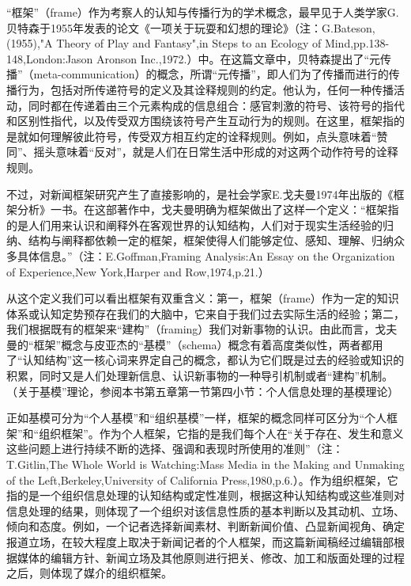 \documentclass[UTF8,12pt]{ctexart}
\numberwithin{equation}{section} %
\numberwithin{figure}{section}
\numberwithin{table}{section}
\begin{document}
	“框架”（frame）作为考察人的认知与传播行为的学术概念，最早见于人类学家G.贝特森于1955年发表的论文《一项关于玩耍和幻想的理论》（注：G.Bateson,(1955),"A Theory of Play and Fantasy",in Steps to an Ecology of Mind,pp.138-148,London:Jason Aronson Inc.,1972.）中。在这篇文章中，贝特森提出了“元传播”（meta-communication）的概念，所谓“元传播”，即人们为了传播而进行的传播行为，包括对所传递符号的定义及其诠释规则的约定。他认为，任何一种传播活动，同时都在传递着由三个元素构成的信息组合：感官刺激的符号、该符号的指代和区别性指代，以及传受双方围绕该符号产生互动行为的规则。在这里，框架指的是就如何理解彼此符号，传受双方相互约定的诠释规则。例如，点头意味着“赞同”、摇头意味着“反对”，就是人们在日常生活中形成的对这两个动作符号的诠释规则。
	
	不过，对新闻框架研究产生了直接影响的，是社会学家E.戈夫曼1974年出版的《框架分析》一书。在这部著作中，戈夫曼明确为框架做出了这样一个定义：“框架指的是人们用来认识和阐释外在客观世界的认知结构，人们对于现实生活经验的归纳、结构与阐释都依赖一定的框架，框架使得人们能够定位、感知、理解、归纳众多具体信息。”（注：E.Goffman,Framing Analysis:An Essay on the Organization of Experience,New York,Harper and Row,1974,p.21.）
	
	从这个定义我们可以看出框架有双重含义：第一，框架（frame）作为一定的知识体系或认知定势预存在我们的大脑中，它来自于我们过去实际生活的经验；第二，我们根据既有的框架来“建构”（framing）我们对新事物的认识。由此而言，戈夫曼的“框架”概念与皮亚杰的“基模”（schema）概念有着高度类似性，两者都用了“认知结构”这一核心词来界定自己的概念，都认为它们既是过去的经验或知识的积累，同时又是人们处理新信息、认识新事物的一种导引机制或者“建构”机制。（关于基模”理论，参阅本书第五章第一节第四小节：个人信息处理的基模理论）
	
	正如基模可分为“个人基模”和“组织基模”一样，框架的概念同样可区分为“个人框架”和“组织框架”。作为个人框架，它指的是我们每个人在“关于存在、发生和意义这些问题上进行持续不断的选择、强调和表现时所使用的准则”（注：T.Gitlin,The Whole World is Watching:Mass Media in the Making and Unmaking of the Left,Berkeley,University of California Press,1980,p.6.）。作为组织框架，它指的是一个组织信息处理的认知结构或定性准则，根据这种认知结构或这些准则对信息处理的结果，则体现了一个组织对该信息性质的基本判断以及其动机、立场、倾向和态度。例如，一个记者选择新闻素材、判断新闻价值、凸显新闻视角、确定报道立场，在较大程度上取决于新闻记者的个人框架，而这篇新闻稿经过编辑部根据媒体的编辑方针、新闻立场及其他原则进行把关、修改、加工和版面处理的过程之后，则体现了媒介的组织框架。
	
\end{document}
